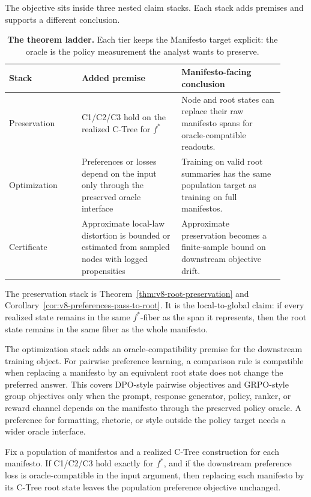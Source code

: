 The objective sits inside three nested claim stacks. Each stack adds premises
and supports a different conclusion.

\begin{table}[t]
\centering
\small
\begin{tabular}{@{}p{0.24\linewidth}p{0.33\linewidth}p{0.34\linewidth}@{}}
\toprule
Stack & Added premise & Manifesto-facing conclusion \\
\midrule
Preservation & C1/C2/C3 hold on the realized C-Tree for \(f^\ast\) &
Node and root states can replace their raw manifesto spans for
oracle-compatible readouts. \\
Optimization & Preferences or losses depend on the input only through the
preserved oracle interface &
Training on valid root summaries has the same population target as training
on full manifestos. \\
Certificate & Approximate local-law distortion is bounded or estimated from
sampled nodes with logged propensities &
Approximate preservation becomes a finite-sample bound on downstream
objective drift. \\
\bottomrule
\end{tabular}
\caption{\textbf{The theorem ladder.} Each tier keeps the Manifesto target
explicit: the oracle is the policy measurement the analyst wants to preserve.}
\label{tab:v8-theorem-ladder}
\end{table}

The preservation stack is Theorem~\ref{thm:v8-root-preservation} and
Corollary~\ref{cor:v8-preferences-pass-to-root}. It is the local-to-global
claim: if every realized state remains in the same \(f^\ast\)-fiber as the
span it represents, then the root state remains in the same fiber as the whole
manifesto.

The optimization stack adds an oracle-compatibility premise for the downstream
training object. For pairwise preference learning, a comparison rule is
compatible when replacing a manifesto by an equivalent root state does not
change the preferred answer. This covers DPO-style pairwise objectives
\citep{BradleyTerry1952,RafailovEtAl2023DPO} and GRPO-style group objectives
only when the prompt, response generator, policy, ranker, or reward channel
depends on the manifesto through the preserved policy oracle. A preference for
formatting, rhetoric, or style outside the policy target needs a wider oracle
interface.

\begin{proposition}
\label{prop:v8-manifesto-preference-equivalence}
Fix a population of manifestos and a realized C-Tree construction for each
manifesto. If C1/C2/C3 hold exactly for \(f^\ast\), and if the downstream
preference loss is oracle-compatible in the input argument, then replacing each
manifesto by its C-Tree root state leaves the population preference objective
unchanged.
\end{proposition}

